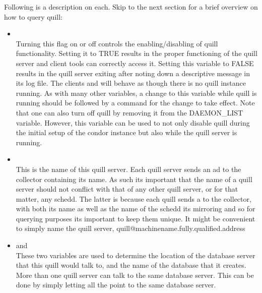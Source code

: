 \begin{enumerate}
Following is a description on each.  Skip to the next section for a brief 
overview on how to query quill:

\begin{itemize}
\item {}\\
Turning this flag on or off controls the enabling/disabling of quill functionality.  
Setting it to TRUE results in the proper functioning of the quill server and client tools 
can correctly access it.  Setting this variable to FALSE results in the quill server 
exiting after noting down a descriptive message in its log file.  The clients 
 and  will behave as though there is no quill instance 
running.  As with many other variables, a change to this variable while quill is 
running should be followed by a  command for the change to take effect. 
Note that one can also turn off quill by removing it from the DAEMON\_LIST variable.  
However, this variable can be used to not only disable quill during the initial setup of 
the condor instance but also while the quill server is running.

\item {}\\
This is the name of this quill server.  Each quill server sends an ad to
the collector containing its name.  As such its important that the name
of a quill server should not conflict with that of any other quill server,
or for that matter, any schedd.  The latter is because each quill sends a
 to the collector, with both its name as well as the name 
of the schedd its mirroring and so for querying purposes its important to keep 
them unique. It might be convenient to simply name the quill server, 
quill@machinename.fully.qualified.address

\item {} and \\
These two variables are used to determine the location of the database
server that this quill would talk to, and the name of the database that
it creates.  More than one quill server can talk to the same database
server.  This can be done by simply letting all the 
 point to the same database server.



\end{itemize}
\end{enumerate}

